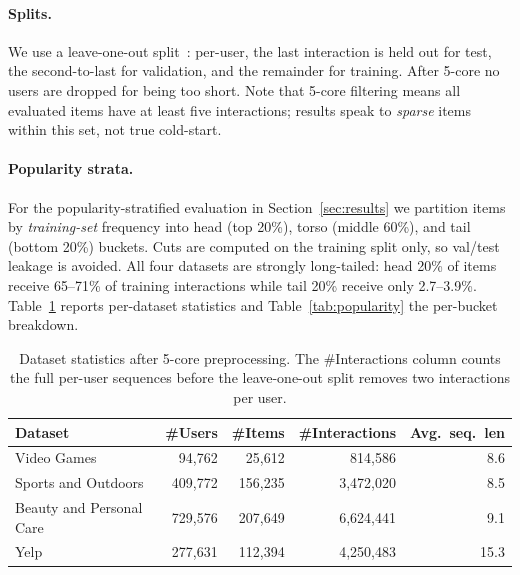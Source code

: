 \documentclass{article}
\begin{document}
\paragraph{Splits.} We use a leave-one-out
split~\citep{kang2018sasrec,sun2019bert4rec}: per-user, the last
interaction is held out for test, the second-to-last for validation,
and the remainder for training. After 5-core no users are dropped
for being too short. Note that 5-core filtering means all evaluated items have at least
five interactions; results speak to \emph{sparse} items within this
set, not true cold-start.

\paragraph{Popularity strata.} For the popularity-stratified
evaluation in Section~\ref{sec:results} we partition items by
\emph{training-set} frequency into head (top 20\%), torso (middle
60\%), and tail (bottom 20\%) buckets. Cuts are computed on the
training split only, so val/test leakage is avoided. All four datasets
are strongly long-tailed: head 20\% of items receive 65--71\% of
training interactions while tail 20\% receive only 2.7--3.9\%.
Table~\ref{tab:datasets} reports per-dataset statistics and
Table~\ref{tab:popularity} the per-bucket breakdown.

\begin{table}[t]
  \centering
  \small
  \caption{Dataset statistics after 5-core preprocessing. The
  \#Interactions column counts the full per-user sequences before
  the leave-one-out split removes two interactions per user.}
  \label{tab:datasets}
  \begin{tabular}{lrrrr}
    \toprule
    Dataset & \#Users & \#Items & \#Interactions & Avg.\ seq.\ len \\
    \midrule
    Video Games               &  94{,}762 &  25{,}612 &    814{,}586 &  8.6 \\
    Sports and Outdoors       & 409{,}772 & 156{,}235 &  3{,}472{,}020 &  8.5 \\
    Beauty and Personal Care  & 729{,}576 & 207{,}649 &  6{,}624{,}441 &  9.1 \\
    Yelp                      & 277{,}631 & 112{,}394 &  4{,}250{,}483 & 15.3 \\
    \bottomrule
  \end{tabular}
\end{table}
\end{document}
